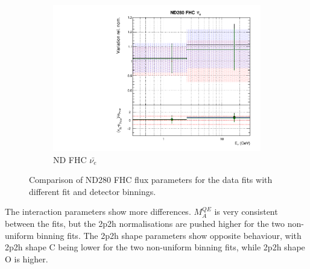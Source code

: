 \begin{figure}[!htbp]
\begin{subfigure}{0.49\textwidth}
  \includegraphics[width=0.99\linewidth]{figs/polydataflux_3}
  \caption{ND FHC $\bar{\nu_{e}}$}
\end{subfigure}
\caption{Comparison of ND280 FHC flux parameters for the data fits with different fit and detector binnings.}
\label{fig:polydatafluxND}
\end{figure}

The interaction parameters show more differences. $M_A^{QE}$ is very consistent between the fits, but the 2p2h normalisations are pushed higher for the two non-uniform binning fits. The 2p2h shape parameters show opposite behaviour, with 2p2h shape C being lower for the two non-uniform binning fits, while 2p2h shape O is higher.


